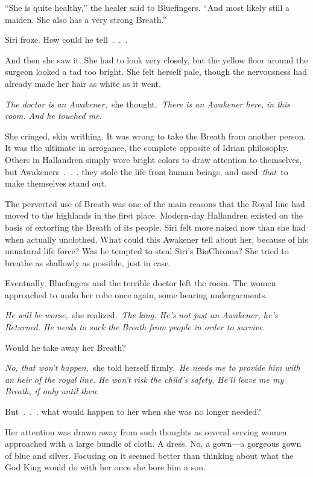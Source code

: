 “She is quite healthy,” the healer said to Bluefingers. “And most likely still a maiden. She also has a very strong Breath.”

Siri froze. How could he tell~.~.~.

And then she saw it. She had to look very closely, but the yellow floor around the surgeon looked a tad too bright. She felt herself pale, though the nervousness had already made her hair as white as it went.

\textit{The doctor is an Awakener,}~she thought.~\textit{There is an Awakener here, in this room. And he touched me.}

She cringed, skin writhing. It was wrong to take the Breath from another person. It was the ultimate in arrogance, the complete opposite of Idrian philosophy. Others in Hallandren simply wore bright colors to draw attention to themselves, but Awakeners~.~.~. they stole the life from human beings, and used~\textit{that}~to make themselves stand out.

The perverted use of Breath was one of the main reasons that the Royal line had moved to the highlands in the first place. Modern-day Hallandren existed on the basis of extorting the Breath of its people. Siri felt more naked now than she had when actually unclothed. What could this Awakener tell about her, because of his unnatural life force? Was he tempted to steal Siri’s BioChroma? She tried to breathe as shallowly as possible, just in case.

Eventually, Bluefingers and the terrible doctor left the room. The women approached to undo her robe once again, some bearing undergarments.

\textit{He will be worse,}~she realized.~\textit{The king. He’s not just an Awakener, he’s Returned. He needs to suck the Breath from people in order to survive.}

Would he take away her Breath?

\textit{No, that won’t happen,}~she told herself firmly.~\textit{He needs me to provide him with an heir of the royal line. He won’t risk the child’s safety. He’ll leave me my Breath, if only until then.}

But~.~.~. what would happen to her when she was no longer needed?

Her attention was drawn away from such thoughts as several serving women approached with a large bundle of cloth. A dress. No, a gown—a gorgeous gown of blue and silver. Focusing on it seemed better than thinking about what the God King would do with her once she bore him a son.

